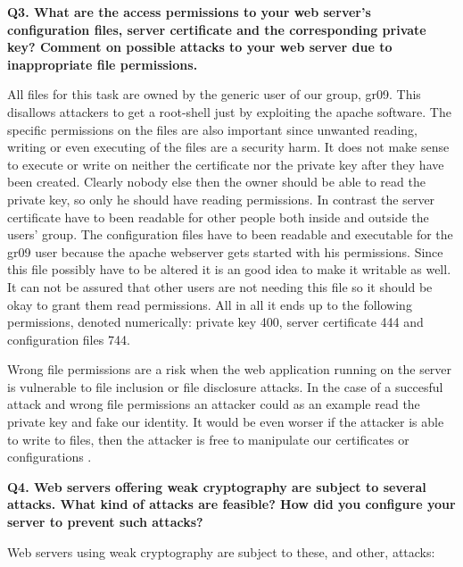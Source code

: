 \noindent
{\bf Q3. What are the access permissions to your web server’s configuration files,
server certificate and the corresponding private key? Comment on possible
attacks to your web server due to inappropriate file permissions.}
\newline

\noindent
All files for this task are owned by the generic user of our group, gr09. This disallows attackers to get a root-shell just by exploiting the apache software. The specific permissions on the files are also important since unwanted reading, writing or even executing of the files are a security harm. It does not make sense to execute or write on neither the certificate nor the private key after they have been created. Clearly nobody else then the owner should be able to read the private key, so only he should have reading permissions. In contrast the server certificate have to been readable for other people both inside and outside the users' group. The configuration files have to been readable and executable for the gr09 user because the apache webserver gets started with his permissions. Since this file possibly have to be altered it is an good idea to make it writable as well. 
It can not be assured that other users are not needing this file so it should be okay to grant them read permissions. All in all it ends up to the following permissions, denoted numerically: private key 400, server certificate 444 and configuration files 744. \cite {linuxsecurity} 
\newline

\noindent
Wrong file permissions are a risk when the web application running on the server is vulnerable to file inclusion or file disclosure attacks. In the case of a succesful attack and wrong file permissions an attacker could as an example read the private key and fake our identity. It would be even worser if the attacker is able to write to files, then the attacker is free to manipulate our certificates or configurations \cite{InclDiscl}.
\newline


\noindent
{\bf Q4. Web servers offering weak cryptography are subject to several attacks.
What kind of attacks are feasible? How did you configure your server to prevent such attacks?}
\newline

\noindent
Web servers using weak cryptography are subject to these, and other, attacks:

